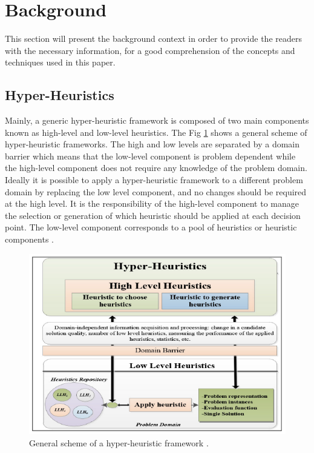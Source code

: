 \documentclass[conference]{IEEEtran}
\begin{document}
\section{Background}
\label{sec:background}

This section will present the background context in order to provide the readers with the necessary information, for a good comprehension of the concepts and techniques used in this paper.  


\subsection{Hyper-Heuristics}
\label{subsec:hyperheuristics}

	Mainly, a generic hyper-heuristic framework is composed of two main components known as high-level and low-level heuristics. The Fig \ref{fig:HyperHeuristicsImg} shows a general scheme of hyper-heuristic frameworks. The high and low levels are separated by a domain barrier which means that the low-level component is problem dependent while the high-level component does not require any knowledge of the problem domain. Ideally it is possible to apply a hyper-heuristic framework to a different problem domain by replacing the low level component, and no changes should be required at the high level. It is the responsibility of the high-level component to manage the selection or generation of which heuristic should be applied at each decision point. The low-level component corresponds to a pool of heuristics or heuristic components \cite{sabar2012grammatical}. 
 
 
\begin{figure}[htb!] 
	\centering
	\includegraphics[scale=0.6]{figures/hyperheuristic.png}
	\caption{General scheme of a hyper-heuristic framework \cite{sabar2012grammatical}.}
	\label{fig:HyperHeuristicsImg}
\end{figure}	
\end{document}
